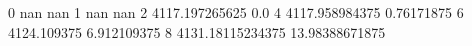 0 nan nan
1 nan nan
2 4117.197265625 0.0
4 4117.958984375 0.76171875
6 4124.109375 6.912109375
8 4131.18115234375 13.98388671875
